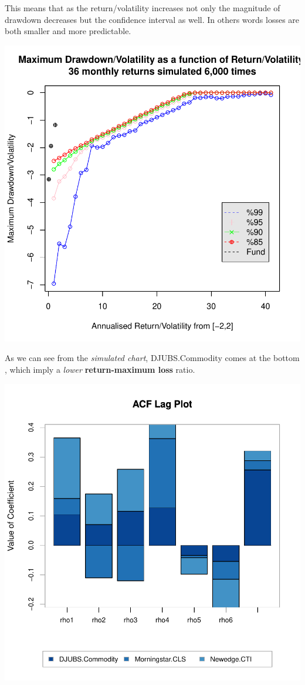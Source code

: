 \documentclass[12pt,letterpaper,english]{article}
\begin{document}
This means that as the return/volatility increases not only the magnitude of drawdown decreases but the confidence interval as well. In others words losses are both smaller and more predictable.

\includegraphics{Commodity-010}

As we can see from the \emph{simulated chart}, DJUBS.Commodity comes at the bottom , which imply a \emph{lower} \textbf{return-maximum loss} ratio.

\includegraphics{Commodity-011}
\end{document}
